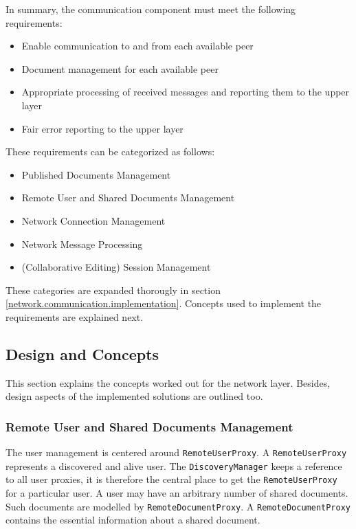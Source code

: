 In summary, the communication component must meet the following requirements:

\begin{itemize}
 \item Enable communication to and from each available peer
 \item Document management for each available peer
 \item Appropriate processing of received messages and reporting them to the upper layer
 \item Fair error reporting to the upper layer
\end{itemize}

These requirements can be categorized as follows:

\begin{itemize}
 \item Published Documents Management
 \item Remote User and Shared Documents Management
 \item Network Connection Management
 \item Network Message Processing
 \item (Collaborative Editing) Session Management
\end{itemize}

These categories are expanded thorougly in section \ref{network.communication.implementation}. Concepts used to implement the requirements are explained next.

\subsection{Design and Concepts}
This section explains the concepts worked out for the network layer. Besides, design aspects of the implemented solutions are outlined too.

\subsubsection{Remote User and Shared Documents Management}
The user management is centered around \texttt{RemoteUserProxy}. A  \texttt{Remote\-User\-Proxy} represents a discovered and alive user. The  \texttt{DiscoveryManager} keeps a reference to all user proxies, it is therefore the central place to get the  \texttt{RemoteUserProxy} for a particular user. A user may have an arbitrary number of shared documents. Such documents are modelled by  \texttt{RemoteDocumentProxy}. A  \texttt{RemoteDocumentProxy} contains the essential information about a shared document.

